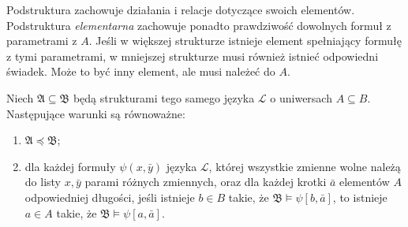 \begin{uwaga}
Podstruktura zachowuje działania i relacje dotyczące swoich
elementów. Podstruktura \emph{elementarna} zachowuje ponadto
prawdziwość dowolnych formuł z parametrami z $A$.
Jeśli w większej strukturze istnieje element spełniający
formułę z tymi parametrami, w mniejszej strukturze musi
również istnieć odpowiedni świadek. Może to być inny element,
ale musi należeć do $A$.
\end{uwaga}

\begin{twierdzenie}\label{thm:model-tarski-vaught}
Niech $\mathfrak A\subseteq\mathfrak B$ będą strukturami
tego samego języka $\mathcal L$ o uniwersach $A\subseteq B$.
Następujące warunki są równoważne:
\begin{enumerate}[label=(\roman*)]
\item $\mathfrak A\preccurlyeq\mathfrak B$;
\item dla każdej formuły $\psi(x,\bar y)$ języka $\mathcal L$,
której wszystkie zmienne wolne należą do listy
$x,\bar y$ parami różnych zmiennych, oraz dla każdej krotki
$\bar a$ elementów $A$ odpowiedniej długości,
jeśli istnieje $b\in B$ takie, że
$\mathfrak B\models\psi[b,\bar a]$,
to istnieje $a\in A$ takie, że
$\mathfrak B\models\psi[a,\bar a]$.
\end{enumerate}
\end{twierdzenie}
